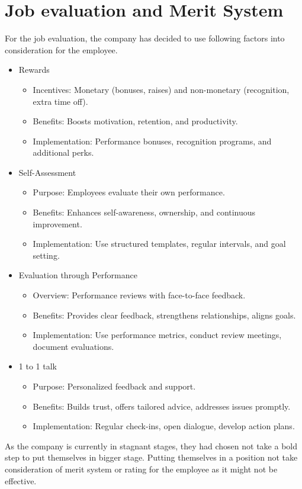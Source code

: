 \section{Job evaluation and Merit System}
For the job evaluation, the company has decided to use following factors into consideration for the employee.
\begin{itemize}
    \item Rewards
    \begin{itemize}
    \item Incentives: Monetary (bonuses, raises) and non-monetary (recognition, extra time off).
    \item Benefits: Boosts motivation, retention, and productivity.
    \item Implementation: Performance bonuses, recognition programs, and additional perks.
\end{itemize}
    \item Self-Assessment
    \begin{itemize}
    \item Purpose: Employees evaluate their own performance.
    \item Benefits: Enhances self-awareness, ownership, and continuous improvement.
    \item Implementation: Use structured templates, regular intervals, and goal setting.
\end{itemize}
    \item Evaluation through Performance
    \begin{itemize}
    \item Overview: Performance reviews with face-to-face feedback.
    \item Benefits: Provides clear feedback, strengthens relationships, aligns goals.
    \item Implementation: Use performance metrics, conduct review meetings, document evaluations.
\end{itemize}
    \item 1 to 1 talk
    \begin{itemize}
    \item Purpose: Personalized feedback and support.
    \item Benefits: Builds trust, offers tailored advice, addresses issues promptly.
    \item Implementation: Regular check-ins, open dialogue, develop action plans.
\end{itemize}
\end{itemize}
As the company is currently in stagnant stages, they had chosen not take a bold step to put themselves in bigger stage. Putting themselves in a position not take consideration of merit system or rating for the employee as it might not be effective.
